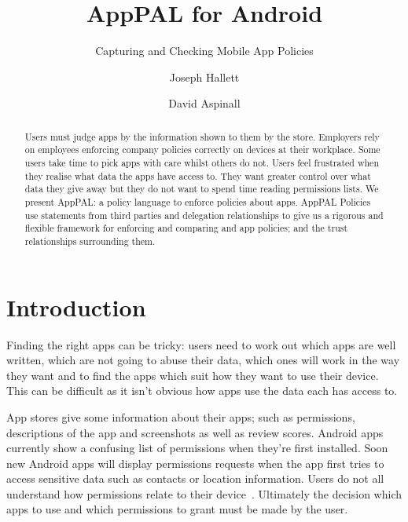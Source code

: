 \documentclass[]{llncs}
\title{AppPAL for Android}
\subtitle{Capturing and Checking Mobile App Policies}
\author{Joseph Hallett \and David Aspinall }
\institute{University of Edinburgh}
\newcommand{\comment}[1]{}%
\begin{document}
\maketitle{}

\begin{abstract}
  Users must judge apps by the information shown to them by the store.
  Employers rely on employees enforcing company policies correctly on devices at their workplace.
  Some users take time to pick apps with care whilst others do not.
  Users feel frustrated when they realise what data the apps have access to.
  They want greater control over what data they give away but they do not want to spend time reading permissions lists.
  We present AppPAL: a policy language to enforce policies about apps.
  AppPAL Policies use statements from third parties and delegation relationships to
  give us a rigorous and flexible framework for enforcing and comparing and app policies; and the trust relationships surrounding them.
\end{abstract}

\section{Introduction \comment{1 page}}
\label{sec:introduction}

Finding the right apps can be tricky:
  users need to work out which apps are well written, which are not going to abuse their data, which ones will work in the way they want
  and to find the apps which suit how they want to use their device.
This can be difficult as it isn't obvious how apps use the data each has access to.

App stores give some information about their apps; such as permissions, descriptions of the app and screenshots as well as review scores.
Android apps currently show a confusing list of permissions when they're first installed.
Soon new Android apps will display permissions requests when the app first tries to access sensitive data such as contacts or location information.
Users do not all understand how permissions relate to their device~\cite{Felt:2012hm,Thompson:2013eb}.
Ultimately the decision which apps to use and which permissions to grant must be made by the user.
\end{document}
